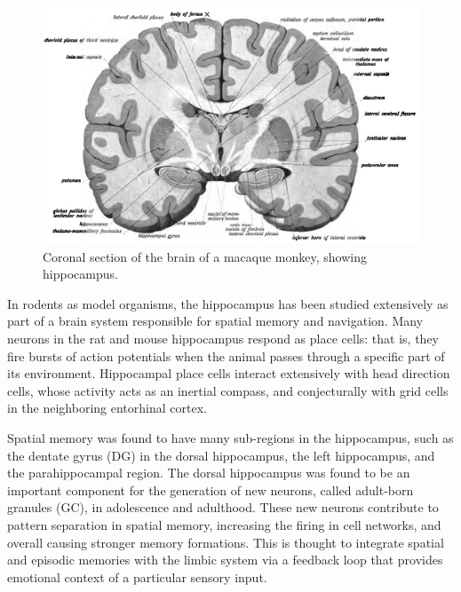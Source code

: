 \begin{figure}

{\centering \includegraphics[width=0.7\linewidth]{./figures/cns/Sobo_1909_646} 

}

\caption{Coronal section of the brain of a macaque monkey, showing hippocampus.}\label{fig:hippocross}
\end{figure}

In rodents as model organisms, the hippocampus has been studied extensively as part of a brain system responsible for spatial memory and navigation. Many neurons in the rat and mouse hippocampus respond as place cells: that is, they fire bursts of action potentials when the animal passes through a specific part of its environment. Hippocampal place cells interact extensively with head direction cells, whose activity acts as an inertial compass, and conjecturally with grid cells in the neighboring entorhinal cortex.

Spatial memory was found to have many sub-regions in the hippocampus, such as the dentate gyrus (DG) in the dorsal hippocampus, the left hippocampus, and the parahippocampal region. The dorsal hippocampus was found to be an important component for the generation of new neurons, called adult-born granules (GC), in adolescence and adulthood. These new neurons contribute to pattern separation in spatial memory, increasing the firing in cell networks, and overall causing stronger memory formations. This is thought to integrate spatial and episodic memories with the limbic system via a feedback loop that provides emotional context of a particular sensory input.



